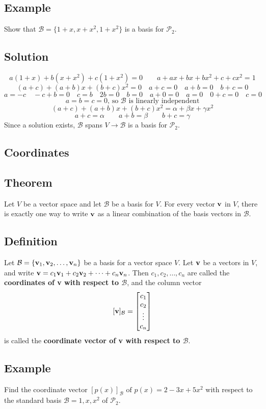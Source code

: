 \subsection*{Example}
Show that $\mathcal{B}=\{1+x,x+x^2,1+x^2\}$ is a basis for $\mathscr{P}_2$.

\subsection*{Solution}
\[a(1+x)+b(x+x^2)+c(1+x^2)=0 \qquad a+ax+bx+bx^2+c+cx^2=1\]
\[(a+c)+(a+b)x+(b+c)x^2=0 \quad a+c=0 \quad a+b=0 \quad b+c=0\]
\[a=-c \quad -c+b=0 \quad c=b \quad 2b=0 \quad b=0 \quad a+0=0 \quad a=0 \quad 0+c=0 \quad c=0\]
\[a=b=c=0\text{, so $\mathcal{B}$ is linearly independent}\]
\[(a+c)+(a+b)x+(b+c)x^2=\alpha+\beta x+\gamma x^2\]
\[a+c=\alpha \qquad a+b=\beta \qquad b+c=\gamma\]
Since a solution exists, $\mathcal{B}$ spans $V\to\mathcal{B}$ is a basis for $\mathscr{P}_2$.

\subsection*{Coordinates}

\subsection*{Theorem}
Let $V$ be a vector space and let $\mathcal{B}$ be a basis for $V$. For every vector
$\mathbf{v}$ in $V$, there is exactly one way to write $\mathbf{v}$ as a linear combination
of the basis vectors in $\mathcal{B}$.

\subsection*{Definition}
Let $\mathcal{B}=\{\mathbf{v}_1,\mathbf{v}_2,\dots,\mathbf{v}_n\}$ be a basis for a vector space $V$.
Let $\mathbf{v}$ be a vectors in $V$, and write $\mathbf{v}=c_1\mathbf{v}_1+c_2\mathbf{v}_2+\dots+c_n\mathbf{v}_n$.
Then $c_1,c_2,\dots,c_n$ are called the \textbf{coordinates of v with respect to $\mathcal{B}$},
and the column vector
\[[\mathbf{v}]_\mathcal{B}=\begin{bmatrix}
        c_1 \\c_2\\ \vdots \\ c_n
    \end{bmatrix}\]
is called the \textbf{coordinate vector of v with respect to $\mathcal{B}$}.

\subsection*{Example}
Find the coordinate vector $[p(x)]_\mathcal{B} \text{ of } p(x)=2-3x+5x^2$
with respect to the standard basis $\mathcal{B}={1, x, x^2}$ of $\mathscr{P}_2$.

